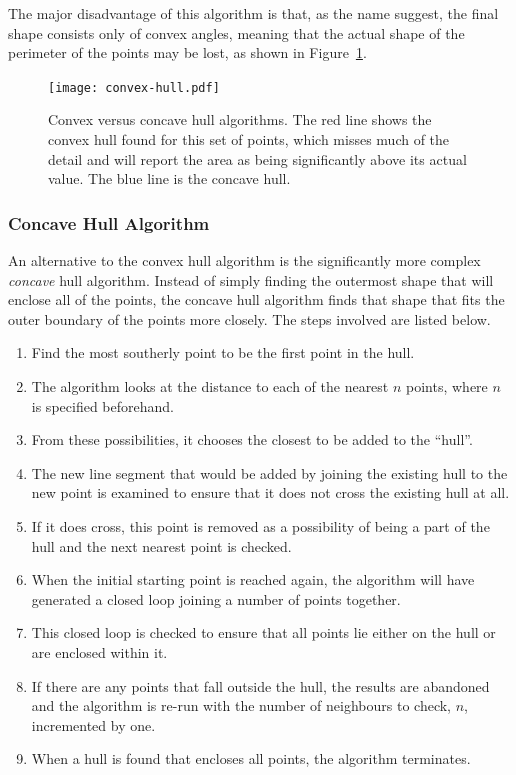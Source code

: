 The major disadvantage of this algorithm is that, as the name suggest, the
final shape consists only of convex angles, meaning that the actual shape of
the perimeter of the points may be lost, as shown in
Figure~\ref{fig:convex-hull}.

\begin{figure}[tbh]
	\centering
	\texttt{[image: convex-hull.pdf]}

	\caption[Convex versus concave hull algorithms.]{Convex versus concave hull
		algorithms. The red line shows the convex hull found for this set of
		points, which misses much of the detail and will report the area as
		being significantly above its actual value. The blue line is the
		concave hull.}\label{fig:convex-hull}
\end{figure}

\subsubsection*{Concave Hull Algorithm}
\label{ssub:Concave Hull Algorithm}

An alternative to the convex hull algorithm is the significantly more complex
\emph{concave} hull algorithm\cite{moreira2007concave}. Instead of simply
finding the outermost shape that will enclose all of the points, the concave
hull algorithm finds that shape that fits the outer boundary of the points more
closely. The steps involved are listed below.

\begin{enumerate}
	\item Find the most southerly point to be the first point in the hull.
	\item The algorithm looks at the distance to each of the nearest $n$
		points, where $n$ is specified beforehand.
	\item From these possibilities, it chooses the closest to be added to the
		``hull''.
	\item The new line segment that would be added by joining the existing hull
		to the new point is examined to ensure that it does not cross the
		existing hull at all.
	\item If it does cross, this point is removed as a possibility of being a
		part of the hull and the next nearest point is checked.
	\item When the initial starting point is reached again, the algorithm will
		have generated a closed loop joining a number of points together.
	\item This closed loop is checked to ensure that all points lie either on
		the hull or are enclosed within it.
	\item If there are any points that fall outside the hull, the results are
		abandoned and the algorithm is re-run with the number of neighbours to
		check, $n$, incremented by one.
	\item When a hull is found that encloses all points, the algorithm
		terminates.
\end{enumerate}

